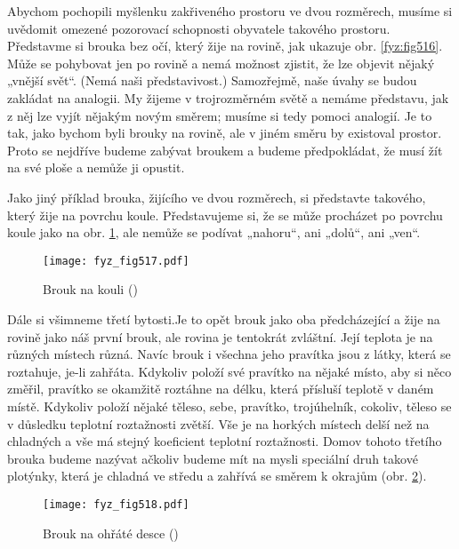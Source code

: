     Abychom pochopili myšlenku zakřiveného prostoru ve dvou rozměrech, musíme si uvědomit omezené 
    pozorovací schopnosti obyvatele takového prostoru. Představme si brouka bez očí, který žije na 
    rovině, jak ukazuje obr. \ref{fyz:fig516}. Může se pohybovat jen po rovině a nemá možnost 
    zjistit, že lze objevit nějaký „vnější svět“. (Nemá naši představivost.) Samozřejmě, naše úvahy 
    se budou zakládat na analogii. My žijeme v trojrozměrném světě a nemáme představu, jak z něj 
    lze vyjít nějakým novým směrem; musíme si tedy pomoci analogií. Je to tak, jako bychom byli 
    brouky na rovině, ale v jiném směru by existoval prostor. Proto se nejdříve budeme zabývat 
    broukem a budeme předpokládat, že musí žít na své ploše a nemůže ji opustit.
    
    Jako jiný příklad brouka, žijícího ve dvou rozměrech, si představte takového, který žije na 
    povrchu koule. Představujeme si, že se může procházet po povrchu koule jako na obr. 
    \ref{fyz:fig517}, ale nemůže se podívat „nahoru“, ani „dolů“, ani „ven“.
    
    \begin{figure}[ht!] %
      \centering
      \texttt{[image: fyz\_fig517.pdf]}
      \caption{Brouk na kouli (\cite[s.~775]{Feynman02})}
      \label{fyz:fig517}
    \end{figure}
    
    Dále si všimneme třetí bytosti.Je to opět brouk jako oba předcházející a žije na rovině jako 
    náš první brouk, ale rovina je tentokrát zvláštní. Její teplota je na různých místech různá. 
    Navíc brouk i všechna jeho pravítka jsou z látky, která se roztahuje, je-li zahřáta. Kdykoliv 
    položí své pravítko na nějaké místo, aby si něco změřil, pravítko se okamžitě roztáhne na 
    délku, která přísluší teplotě v daném místě. Kdykoliv položí nějaké těleso, sebe, pravítko, 
    trojúhelník, cokoliv, těleso se v důsledku teplotní roztažnosti zvětší. Vše je na horkých 
    místech delší než na chladných a vše má stejný koeficient teplotní roztažnosti. Domov tohoto 
    třetího brouka budeme nazývat  ačkoliv budeme mít na mysli speciální druh 
    takové plotýnky, která je chladná ve středu a zahřívá se směrem k okrajům (obr. 
    \ref{fyz:fig518}).
    
    \begin{figure}[ht!] %
      \centering
      \texttt{[image: fyz\_fig518.pdf]}
      \caption{Brouk na ohřáté desce (\cite[s.~776]{Feynman02})}
      \label{fyz:fig518}
    \end{figure}
    

